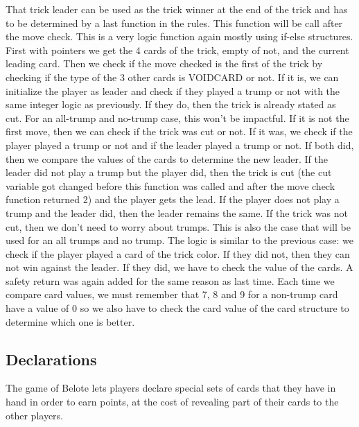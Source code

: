 \documentclass[12pt]{article}
\begin{document}
That trick leader can be used as the trick winner at the end of the trick and has to be determined by a last function in the rules. This function will be call after the move check. This is a very logic function again mostly using if-else structures. First with pointers we get the 4 cards of the trick, empty of not, and the current leading card. Then we check if the move checked is the first of the trick by checking if the type of the 3 other cards is VOIDCARD or not. If it is, we can initialize the player as leader and check if they played a trump or not with the same integer logic as previously. If they do, then the trick is already stated as cut. For an all-trump and no-trump case, this won’t be impactful. If it is not the first move, then we can check if the trick was cut or not. If it was, we check if the player played a trump or not and if the leader played a trump or not. If both did, then we compare the values of the cards to determine the new leader. If the leader did not play a trump but the player did, then the trick is cut (the cut variable got changed before this function was called and after the move check function returned 2) and the player gets the lead. If the player does not play a trump and the leader did, then the leader remains the same. If the trick was not cut, then we don’t need to worry about trumps. This is also the case that will be used for an all trumps and no trump. The logic is similar to the previous case: we check if the player played a card of the trick color. If they did not, then they can not win against the leader. If they did, we have to check the value of the cards. A safety return was again added for the same reason as last time. Each time we compare card values, we must remember that 7, 8 and 9 for a non-trump card have a value of 0 so we also have to check the card value of the card structure to determine which one is better.

\subsection{Declarations}

The game of Belote lets players declare special sets of cards that they have in hand in order to earn points, at the cost of revealing part of their cards to the other players.
\end{document}
